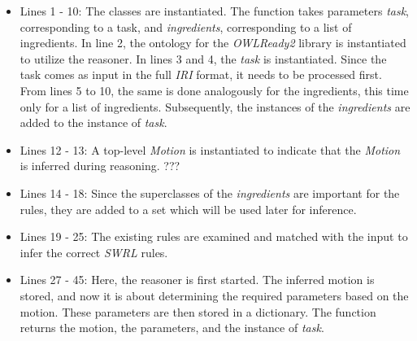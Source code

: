 \begin{itemize}
    \item Lines 1 - 10: The classes are instantiated. The function takes parameters \textit{task}, corresponding to a task, and \textit{ingredients}, corresponding to a list of ingredients. In line 2, the ontology for the \textit{OWLReady2} library is instantiated to utilize the reasoner. In lines 3 and 4, the \textit{task} is instantiated. Since the task comes as input in the full \textit{IRI} format, it needs to be processed first. From lines 5 to 10, the same is done analogously for the ingredients, this time only for a list of ingredients. Subsequently, the instances of the \textit{ingredients} are added to the instance of \textit{task}.
    \item Lines 12 - 13: A top-level \textit{Motion} is instantiated to indicate that the \textit{Motion} is inferred during reasoning. ???
    \item Lines 14 - 18: Since the superclasses of the \textit{ingredients} are important for the rules, they are added to a set which will be used later for inference.
    \item Lines 19 - 25: The existing rules are examined and matched with the input to infer the correct \textit{SWRL} rules.
    \item Lines 27 - 45: Here, the reasoner is first started. The inferred motion is stored, and now it is about determining the required parameters based on the motion. These parameters are then stored in a dictionary. The function returns the motion, the parameters, and the instance of \textit{task}.
\end{itemize}

